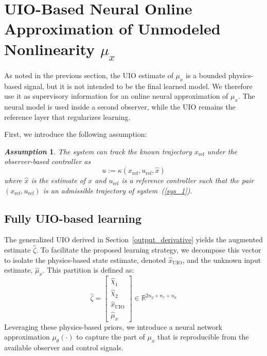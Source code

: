 \documentclass{ifacconf}
\def\eqref#1{(\ref{#1})}
\def\uio{\mathrm{UIO}}
\def\refx{\mathrm{ref}}
\newtheorem{assumption}{\it \textbf{Assumption}}%
\begin{document}
\section{UIO-Based Neural Online Approximation of Unmodeled Nonlinearity $\mu_{x}$}\label{learning}
\vspace*{-0.3cm}
%
As noted in the previous section, the UIO estimate of $\mu_x$ is a bounded physics-based signal, but it is not intended to be the final learned model. We therefore use it as supervisory information for an online neural approximation of $\mu_x$. The neural model is used inside a second observer, while the UIO remains the reference layer that regularizes learning.

First, we introduce the following assumption:
\begin{assumption}\label{huy_hyp1}
    The system can track the known trajectory $x_{\refx}$ under the observer-based controller as
    \begin{equation}\label{control}
        u := \kappa\left(x_\refx, u_{\refx},\hat{x}\right)
    \end{equation}
    where $\hat{x}$ is the estimate of $x$ and $u_{\refx}$ is a reference controller such that the pair $\left(x_{\refx}, u_{\refx} \right)$ is an admissible trajectory of system~\eqref{sys_1}.
\end{assumption}


\subsection{Fully UIO-based learning}\label{learning_uio}
\vspace*{-0.3cm}
The generalized UIO derived in Section~\ref{output_derivative} yields the augmented estimate $\hat{\zeta}$. To facilitate the proposed learning strategy, we decompose this vector to isolate the physics-based state estimate, denoted $\hat{x}_{\uio}$, and the unknown input estimate, $\hat{\mu}_x$. This partition is defined as:
\begin{equation}
    \hat{\zeta} = \begin{bmatrix} \hat{\chi}_1 \\ \hat{\chi}_2 \\ \hat{x}_{\uio} \\ \hat{\mu}_x \end{bmatrix} \in \mathbb{R}^{2n_y + n_x + n_\mu}
\end{equation}
Leveraging these physics-based priors, we introduce a neural network approximation $\mu_{\theta}(\cdot)$ to capture the part of $\mu_x$ that is reproducible from the available observer and control signals.
\end{document}
